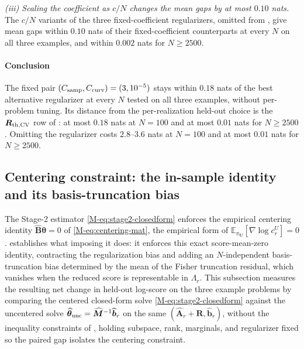 \documentclass[supplement,review,hidelinks,onefignum,onetabnum]{siamart251216}
\newcommand{\EE}{\mathbb{E}}
\newcommand{\mR}{\bm{R}}
\newcommand{\vU}{\bm{U}}
\begin{document}
\textit{(iii) Scaling the coefficient as $c/N$ changes the mean gaps by at most $0.10$ nats.} The $c/N$ variants of the three fixed-coefficient regularizers, omitted from , give mean gaps within $0.10$ nats of their fixed-coefficient counterparts at every $N$ on all three examples, and within $0.002$ nats for $N \ge 2500$.

\paragraph{Conclusion} The fixed pair $(C_{\rm samp}, C_{\rm curv}) = (3, 10^{-5})$ stays within $0.18$ nats of the best alternative regularizer at every $N$ tested on all three examples, without per-problem tuning. Its distance from the per-realization held-out choice is the $\mR_{\rm th,CV}$ row of : at most $0.18$ nats at $N = 100$ and at most $0.01$ nats for $N \ge 2500$. Omitting the regularizer costs $2.8$--$3.6$ nats at $N = 100$ and at most $0.01$ nats for $N \ge 2500$.

\subsection{Centering constraint: the in-sample identity and its basis-truncation bias}
\label{sec:sm2-centering}

The Stage-2 estimator \eqref{M-eq:stage2-closedform} enforces the empirical centering identity $\widehat{\bm B}\bm\theta = 0$ of \eqref{M-eq:centering-mat}, the empirical form of $\EE_{\pi_{\vU}}[\nabla\log c_r^{U}] = 0$.  establishes what imposing it does: it enforces this exact score-mean-zero identity, contracting the regularization bias and adding an $N$-independent basis-truncation bias determined by the mean of the Fisher truncation residual, which vanishes when the reduced score is representable in $\Lambda_r$. This subsection measures the resulting net change in held-out log-score on the three example problems by comparing the centered closed-form solve \eqref{M-eq:stage2-closedform} against the uncentered solve $\widehat{\bm\theta}_{\rm unc} = \widehat{\bm M}^{-1}\widehat{\bm b}_r$ on the same $(\widehat{\bm A}_r + \mR, \widehat{\bm b}_r)$, without the inequality constraints of , holding subspace, rank, marginals, and regularizer fixed so the paired gap isolates the centering constraint.
\end{document}
